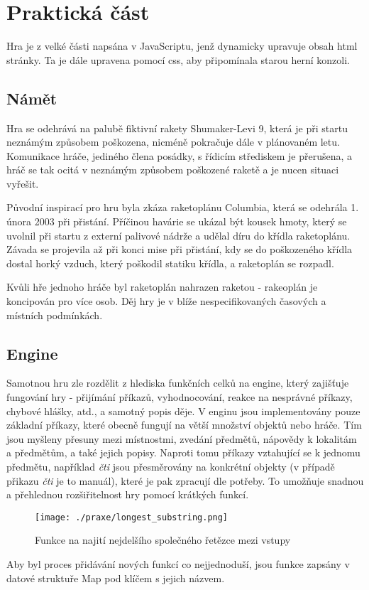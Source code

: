 \documentclass[main.tex]{subfiles}
\begin{document}
\section{Praktická část}
Hra je z velké části napsána v JavaScriptu, jenž dynamicky upravuje obsah html stránky. Ta je dále upravena pomocí css, aby připomínala starou herní konzoli. 

\subsection{Námět}
Hra se odehrává na palubě fiktivní rakety Shumaker-Levi 9, která je při startu neznámým způsobem poškozena, nicméně pokračuje dále v plánovaném letu. Komunikace hráče, jediného člena posádky, s řídicím střediskem je přerušena, a hráč se tak ocitá v neznámým způsobem poškozené raketě a je nucen situaci vyřešit. 

Původní inspirací pro hru byla zkáza raketoplánu Columbia, která se odehrála 1. února 2003 při přistání. Příčinou havárie se ukázal být kousek hmoty, který se uvolnil při startu z externí palivové nádrže a udělal díru do křídla raketoplánu. Závada se projevila až při konci mise při přistání, kdy se do poškozeného křídla dostal horký vzduch, který poškodil statiku křídla, a raketoplán se rozpadl. \cite{web:wik:cz:columbia} 

Kvůli hře jednoho hráče byl raketoplán nahrazen raketou - rakeoplán je koncipován pro více osob. Děj hry je v blíže nespecifikovaných časových a místních podmínkách.

\subsection{Engine}
Samotnou hru zle rozdělit z hlediska funkčních celků na engine, který zajišťuje fungování hry - přijímání příkazů, vyhodnocování, reakce na nesprávné příkazy, chybové hlášky, atd., a samotný popis děje.
V enginu jsou implementovány pouze základní příkazy, které obecně fungují na větší množství objektů nebo hráče. Tím jsou myšleny přesuny mezi místnostmi, zvedání předmětů, nápovědy k lokalitám a předmětům, a také jejich popisy. Naproti tomu příkazy vztahující se k jednomu předmětu, například \textit{čti} jsou přesměrovány na konkrétní objekty (v případě přikazu \textit{čti} je to manuál), které je pak zpracují dle potřeby. To umožňuje snadnou a přehlednou rozšiřitelnost hry pomocí krátkých funkcí.

		\begin{figure}[h]
			\centering
			\texttt{[image: ./praxe/longest\_substring.png]}
			\caption{Funkce na najití nejdelšího společného řetězce mezi vstupy }
		\end{figure}
Aby byl proces přidávání nových funkcí co nejjednoduší, jsou funkce zapsány v datové struktuře Map pod klíčem s jejich názvem. 
\end{document}
